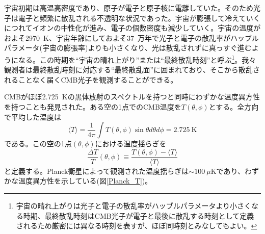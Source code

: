 宇宙初期は高温高密度であり、原子が電子と原子核に電離していた。そのため光子は電子と頻繁に散乱される不透明な状況であった。宇宙が膨張して冷えていくにつれてイオンの中性化が進み、電子の個数密度も減少していく。宇宙の温度がおよそ\SI{2970}{K}、宇宙年齢にしておよそ\SI{37}{万年}で光子と電子の散乱率がハッブルパラメータ(宇宙の膨張率)よりも小さくなり、光は散乱されずに真っすぐ進むようになる。この時期を``宇宙の晴れ上がり''または``最終散乱時刻''と呼ぶ\footnote{宇宙の晴れ上がりは光子と電子の散乱率がハッブルパラメータより小さくなる時期、最終散乱時刻はCMB光子が電子と最後に散乱する時刻として定義されるため厳密には異なる時刻を表すが、ほぼ同時刻とみなしてもよい。}。我々観測者は最終散乱時刻に対応する``最終散乱面''に囲まれており、そこから散乱されることなく届くCMB光子を観測することができる。

CMBがほぼ\SI{2.725}{K}の黒体放射のスペクトルを持つと同時にわずかな温度異方性を持つことも発見された。ある空の1点でのCMB温度を$T(\theta,\phi)$とする。全方向で平均した温度は
\begin{equation}
  \langle T \rangle = \frac{1}{4\pi}\int T(\theta,\phi)\sin\theta d\theta d\phi = \SI{2.725}{\mathrm{K}}
\end{equation}
である。この空の1点$(\theta,\phi)$における温度揺らぎを
\begin{equation}
  \frac{\Delta T}{T}(\theta,\phi) \equiv \frac{T(\theta,\phi) - \langle T \rangle}{\langle T \rangle}
\end{equation}
と定義する。Planck衛星によって観測された温度揺らぎ\cite{Planck_T}は$\sim \SI{100}{\mu\mathrm{K}}$であり、わずかな温度異方性を示している(図\ref{Planck_T})。

